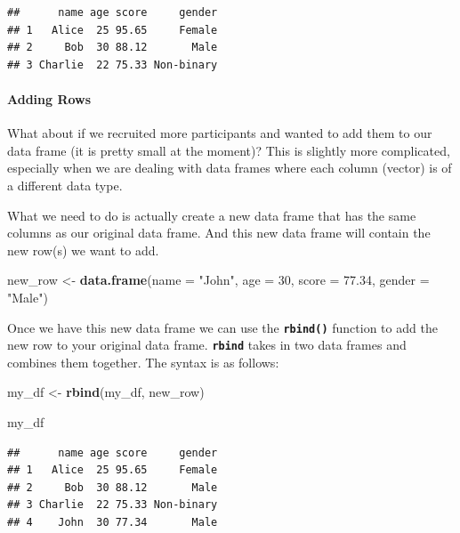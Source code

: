 \documentclass[
]{book}
\newenvironment{Shaded}{\begin{snugshade}}{\end{snugshade}}
\newcommand{\AttributeTok}[1]{\textcolor[rgb]{0.13,0.29,0.53}{#1}}
\newcommand{\DecValTok}[1]{\textcolor[rgb]{0.00,0.00,0.81}{#1}}
\newcommand{\FloatTok}[1]{\textcolor[rgb]{0.00,0.00,0.81}{#1}}
\newcommand{\FunctionTok}[1]{\textcolor[rgb]{0.13,0.29,0.53}{\textbf{#1}}}
\newcommand{\NormalTok}[1]{#1}
\newcommand{\OtherTok}[1]{\textcolor[rgb]{0.56,0.35,0.01}{#1}}
\newcommand{\StringTok}[1]{\textcolor[rgb]{0.31,0.60,0.02}{#1}}
\begin{document}
\begin{verbatim}
##      name age score     gender
## 1   Alice  25 95.65     Female
## 2     Bob  30 88.12       Male
## 3 Charlie  22 75.33 Non-binary
\end{verbatim}

\paragraph{Adding Rows}\label{adding-rows}

What about if we recruited more participants and wanted to add them to our data frame (it is pretty small at the moment)? This is slightly more complicated, especially when we are dealing with data frames where each column (vector) is of a different data type.

What we need to do is actually create a new data frame that has the same columns as our original data frame. And this new data frame will contain the new row(s) we want to add.

\begin{Shaded}
\begin{Highlighting}[]
\NormalTok{new\_row }\OtherTok{\textless{}{-}} \FunctionTok{data.frame}\NormalTok{(}\AttributeTok{name =} \StringTok{"John"}\NormalTok{, }\AttributeTok{age =} \DecValTok{30}\NormalTok{, }\AttributeTok{score =} \FloatTok{77.34}\NormalTok{, }\AttributeTok{gender =} \StringTok{"Male"}\NormalTok{)}
\end{Highlighting}
\end{Shaded}

Once we have this new data frame we can use the \textbf{\texttt{rbind()}} function to add the new row to your original data frame. \textbf{\texttt{rbind}} takes in two data frames and combines them together. The syntax is as follows:

\begin{Shaded}
\begin{Highlighting}[]
\NormalTok{my\_df }\OtherTok{\textless{}{-}} \FunctionTok{rbind}\NormalTok{(my\_df, new\_row)}

\NormalTok{my\_df}
\end{Highlighting}
\end{Shaded}

\begin{verbatim}
##      name age score     gender
## 1   Alice  25 95.65     Female
## 2     Bob  30 88.12       Male
## 3 Charlie  22 75.33 Non-binary
## 4    John  30 77.34       Male
\end{verbatim}
\end{document}
